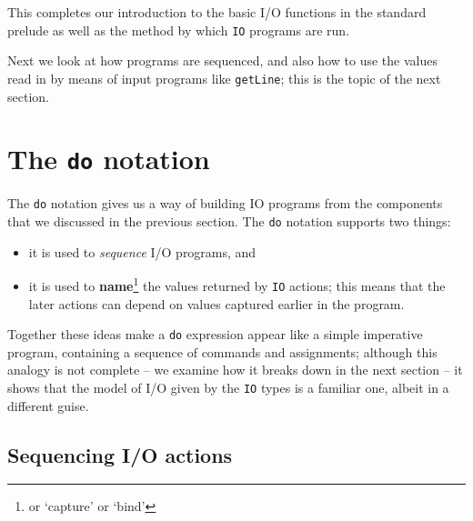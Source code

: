 \noindent This completes our introduction to the basic I/O functions in the standard
prelude as well as the method by which \texttt{IO} programs are run.

Next we look at how programs are sequenced, and also how to use the values read in
by means of input programs like
\texttt{getLine}; this is the topic of the next section. 

\section{The \texttt{do} notation}

The \texttt{do} notation gives us a way of building IO programs from the components that we discussed in the previous section. The \texttt{do} notation supports two things:
\begin{itemize}
\item
it is used to \emph{sequence} I/O programs, and
\item
it is used to \textbf{name}\footnote{or `capture' or `bind'} the values returned by \texttt{IO} actions; this means that the later actions can depend on values captured earlier in the program.
\end{itemize}
Together these ideas make a \texttt{do} expression appear like a
simple imperative program, containing a sequence of commands and
assignments; although this analogy is not complete -- we examine how it
breaks down in the next section -- it shows that the model of I/O given
by the \texttt{IO} types is a familiar one, albeit in a different guise.

\subsection*{Sequencing I/O actions}

